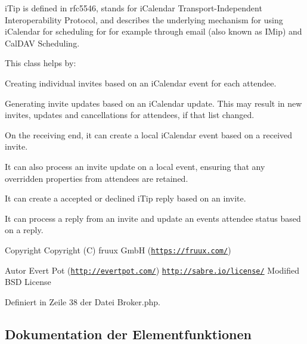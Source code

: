 i\+Tip is defined in rfc5546, stands for i\+Calendar Transport-\/\+Independent Interoperability Protocol, and describes the underlying mechanism for using i\+Calendar for scheduling for for example through email (also known as I\+Mip) and Cal\+D\+AV Scheduling.

This class helps by\+:


\begin{DoxyEnumerate}
\item Creating individual invites based on an i\+Calendar event for each attendee.
\item Generating invite updates based on an i\+Calendar update. This may result in new invites, updates and cancellations for attendees, if that list changed.
\item On the receiving end, it can create a local i\+Calendar event based on a received invite.
\item It can also process an invite update on a local event, ensuring that any overridden properties from attendees are retained.
\item It can create a accepted or declined i\+Tip reply based on an invite.
\item It can process a reply from an invite and update an events attendee status based on a reply.
\end{DoxyEnumerate}

\begin{DoxyCopyright}{Copyright}
Copyright (C) fruux GmbH (\href{https://fruux.com/}{\tt https\+://fruux.\+com/}) 
\end{DoxyCopyright}
\begin{DoxyAuthor}{Autor}
Evert Pot (\href{http://evertpot.com/}{\tt http\+://evertpot.\+com/})  \href{http://sabre.io/license/}{\tt http\+://sabre.\+io/license/} Modified B\+SD License 
\end{DoxyAuthor}


Definiert in Zeile 38 der Datei Broker.\+php.



\subsection{Dokumentation der Elementfunktionen}
\mbox{\label{class_sabre_1_1_v_object_1_1_i_tip_1_1_broker_acb5d4eee69b3e712877343b031bddddf}} 
